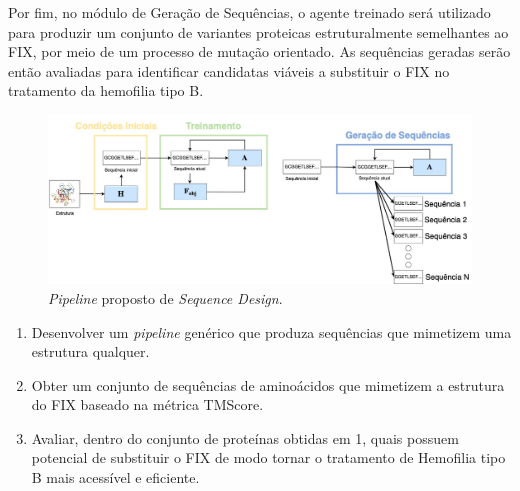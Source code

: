 Por fim, no módulo de Geração de Sequências, 
o agente treinado será utilizado para produzir um conjunto de variantes proteicas estruturalmente semelhantes ao FIX,
por meio de um processo de mutação orientado. 
As sequências geradas serão então avaliadas para identificar candidatas viáveis 
a substituir o FIX no tratamento da hemofilia tipo B.

\begin{figure}[H]
  \centering
  \includegraphics[width=.8\textwidth]{figuras/metodologia-pipeline_proposta.jpg}
  \caption{\textit{Pipeline} proposto de \textit{Sequence Design}.}
  \label{fig:proposta}
\end{figure}


\begin{enumerate}
  \item Desenvolver um \textit{pipeline} genérico que produza sequências que mimetizem uma estrutura qualquer.
  \item Obter um conjunto de sequências de aminoácidos que mimetizem a estrutura do FIX baseado na métrica TMScore.
  \item Avaliar, dentro do conjunto de proteínas obtidas em 1, quais possuem potencial de substituir o FIX de modo tornar o tratamento de Hemofilia tipo B mais acessível e eficiente.
\end{enumerate}

